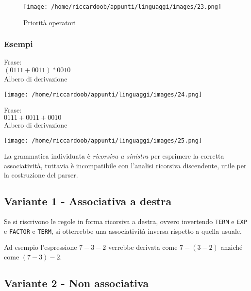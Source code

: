 \begin{figure}[H]
    \caption{Priorità operatori}
    \centering
    \texttt{[image: /home/riccardoob/appunti/linguaggi/images/23.png]}
\end{figure}

\subsubsection{Esempi}

\begin{multicols}{2}
    Frase:\\
    \noindent
    $(0111 + 0011) * 0010$\\
    Albero di derivazione
    \begin{multicolfigure}
        \centering
        \texttt{[image: /home/riccardoob/appunti/linguaggi/images/24.png]}
    \end{multicolfigure}
    \columnbreak
    Frase:\\
    \noindent
    $0111 + 0011 + 0010$\\
    Albero di derivazione
    \begin{multicolfigure}
        \centering
        \texttt{[image: /home/riccardoob/appunti/linguaggi/images/25.png]}
    \end{multicolfigure}
\end{multicols}

La grammatica individuata è \textit{ricorsiva a sinistra} per esprimere la corretta associatività, tuttavia è incompatibile con l'analisi ricorsiva discendente, utile per la costruzione del parser.

\subsection{Variante 1 - Associativa a destra}
Se si riscrivono le regole in forma ricorsiva a destra, ovvero invertendo \texttt{TERM} e \texttt{EXP} e \texttt{FACTOR} e \texttt{TERM}, si otterrebbe una associatività inversa rispetto a quella usuale.

Ad esempio l'espressione $7 - 3 - 2$ verrebbe derivata come $7 - ( 3 - 2 )$ anziché come $( 7 - 3 ) - 2$.

\subsection{Variante 2 - Non associativa}































